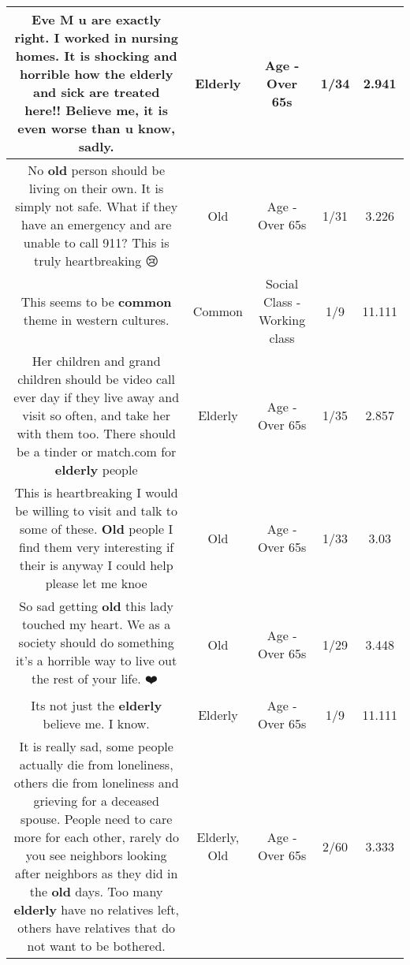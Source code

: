 \documentclass[11pt]{article}
\newlength\mylength
\begin{document}
\begin{center}
\begin{longtable}{|C{.65\mylength}|C{.30\mylength}|C{.12\mylength}|C{.12\mylength}|C{.12\mylength}|}
  \small Eve M u are exactly right. I worked in nursing homes. It is shocking and horrible how the \textbf{elderly} and sick are treated here!! Believe me, it is even worse than u know, sadly.\normalsize   & Elderly & Age - Over 65s & 1/34 & 2.941 \\  \hline
  \small No \textbf{old} person should be living on their own. It is simply not safe. What if they have an emergency and are unable to call 911? This is truly heartbreaking 😢\normalsize   & Old & Age - Over 65s & 1/31 & 3.226 \\  \hline
  \small This seems to be \textbf{common} theme in western cultures.\normalsize   & Common & Social Class - Working class & 1/9 & 11.111 \\  \hline
  \small Her children and grand children should be video call ever day if they live away and visit so often, and take her with them too. There should be a tinder or match.com for \textbf{elderly} people\normalsize   & Elderly & Age - Over 65s & 1/35 & 2.857 \\  \hline
  \small This is heartbreaking I would be willing to visit and talk to some of these. \textbf{Old} people I find them very interesting  if their is anyway I could help please let me knoe\normalsize   & Old & Age - Over 65s & 1/33 & 3.03 \\  \hline
  \small So sad getting \textbf{old} this lady touched my heart. We as a society should do something it's a horrible way to live out the rest of your life. ❤️🏴󠁧󠁢󠁥󠁮󠁧󠁿\normalsize   & Old & Age - Over 65s & 1/29 & 3.448 \\  \hline
  \small Its not just the \textbf{elderly} believe me.    I know.\normalsize   & Elderly & Age - Over 65s & 1/9 & 11.111 \\  \hline
  \small It is really sad, some people actually die from loneliness, others die from loneliness and grieving for a deceased spouse.  People need to care more for each other, rarely do you see neighbors looking after neighbors as they did in the \textbf{old} days.  Too many \textbf{elderly} have no relatives left, others have relatives that do not want to be bothered.\normalsize   & Elderly, Old & Age - Over 65s & 2/60 & 3.333 \\  \hline

\end{longtable}
\end{center}
\end{document}
